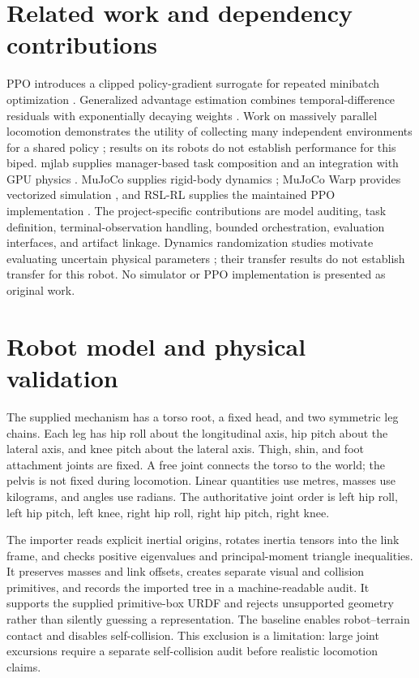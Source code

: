 \documentclass[11pt]{article}
\begin{document}
\section{Related work and dependency contributions}
PPO introduces a clipped policy-gradient surrogate for repeated minibatch optimization \cite{ppo}. Generalized advantage estimation combines temporal-difference residuals with exponentially decaying weights \cite{gae}. Work on massively parallel locomotion demonstrates the utility of collecting many independent environments for a shared policy \cite{rudin}; results on its robots do not establish performance for this biped. mjlab supplies manager-based task composition and an integration with GPU physics \cite{mjlab}. MuJoCo supplies rigid-body dynamics \cite{mujoco}; MuJoCo Warp provides vectorized simulation \cite{mjwarp}, and RSL-RL supplies the maintained PPO implementation \cite{rsl}. The project-specific contributions are model auditing, task definition, terminal-observation handling, bounded orchestration, evaluation interfaces, and artifact linkage. Dynamics randomization studies motivate evaluating uncertain physical parameters \cite{randomization}; their transfer results do not establish transfer for this robot. No simulator or PPO implementation is presented as original work.

\section{Robot model and physical validation}
The supplied mechanism has a torso root, a fixed head, and two symmetric leg chains. Each leg has hip roll about the longitudinal axis, hip pitch about the lateral axis, and knee pitch about the lateral axis. Thigh, shin, and foot attachment joints are fixed. A free joint connects the torso to the world; the pelvis is not fixed during locomotion. Linear quantities use metres, masses use kilograms, and angles use radians. The authoritative joint order is left hip roll, left hip pitch, left knee, right hip roll, right hip pitch, right knee.

The importer reads explicit inertial origins, rotates inertia tensors into the link frame, and checks positive eigenvalues and principal-moment triangle inequalities. It preserves masses and link offsets, creates separate visual and collision primitives, and records the imported tree in a machine-readable audit. It supports the supplied primitive-box URDF and rejects unsupported geometry rather than silently guessing a representation. The baseline enables robot--terrain contact and disables self-collision. This exclusion is a limitation: large joint excursions require a separate self-collision audit before realistic locomotion claims.
\end{document}
